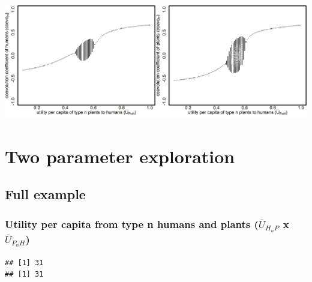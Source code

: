 \documentclass[
]{book}
\begin{document}
\includegraphics[width=1\linewidth]{plots/2_exp_utility_per_capita_type_n_plants_to_humans_oscillation_bifurcationPlotPair}

\hypertarget{two-parameter-exploration}{%
\chapter{Two parameter exploration}\label{two-parameter-exploration}}

\newpage

\hypertarget{full-example}{%
\section{Full example}\label{full-example}}

\hypertarget{utility-per-capita-from-type-n-humans-and-plants-baru_h_np-x-baru_p_nh}{%
\subsection{\texorpdfstring{Utility per capita from type n humans and plants (\(\bar{U}_{H_{n}P}\) x \(\bar{U}_{P_{n}H}\))}{Utility per capita from type n humans and plants (\textbackslash bar\{U\}\_\{H\_\{n\}P\} x \textbackslash bar\{U\}\_\{P\_\{n\}H\})}}\label{utility-per-capita-from-type-n-humans-and-plants-baru_h_np-x-baru_p_nh}}


\begin{verbatim}
## [1] 31
## [1] 31
\end{verbatim}
\end{document}
